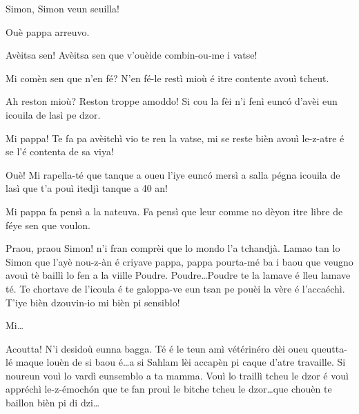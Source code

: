 \begin{drama}

\Cienspeaks Simon, Simon veun seuilla!

\Simonspeaks Ouè pappa arreuvo.

\Cienspeaks Avèitsa sen! Avèitsa sen que v'ouèide combin-ou-me i vatse!

\Simonspeaks Mi comèn sen que n’en fé? N’en fé-le restì mioù é itre contente avouì tcheut. 

\Cienspeaks Ah reston mioù? Reston troppe amoddo! Si cou la fèi n'i fenì eunc\'o d'avèi eun icouila de lasì pe dzor. 

\Simonspeaks Mi pappa! Te fa pa avèitchì vio te ren la vatse, mi se reste bièn avouì le-z-atre é se l’é contenta de sa viya!

\Cienspeaks Ouè! Mi rapella-té que tanque a oueu l'iye eunc\'o mersì a salla pégna icouila de lasì que t'a pouì itedjì tanque a 40 an! 

\Simonspeaks{} Mi pappa fa pensì a la nateuva. Fa pensì que leur comme no dèyon itre libre de féye sen que voulon.

\Cienspeaks Praou, praou Simon! n’i fran comprèi que lo mondo l’a tchandjà. Lamao tan lo Simon que l’ayè nou-z-àn é criyave pappa, pappa pourta-mé ba i baou que veugno avouì tè baillì lo fen a la viille Poudre. Poudre\ldots Poudre te la lamave é lleu lamave té. Te chortave de l’icoula é te galoppa-ve eun tsan pe pouèi la vère é l’accaéchì. T'iye bièn dzouvin-io mi bièn pi sensiblo!

\Simonspeaks Mi\ldots

\Cienspeaks Acoutta! N’i desidoù eunna bagga. Té é le teun amì vétérinéro dèi oueu queutta-lé maque louèn de si baou é\ldots a si Sahlam lèi accapèn pi caque d’atre travaille. Si noureun vouì lo vardì  eunsemblo a ta mamma. Vouì lo traillì tcheu le dzor é vouì appréchì le-z-émoch\'on que te fan prouì le bitche tcheu le dzor\ldots que chouèn te baillon bièn pi di dzi\ldots

\ridocliou

\DeriLeRido
{}

\end{drama}